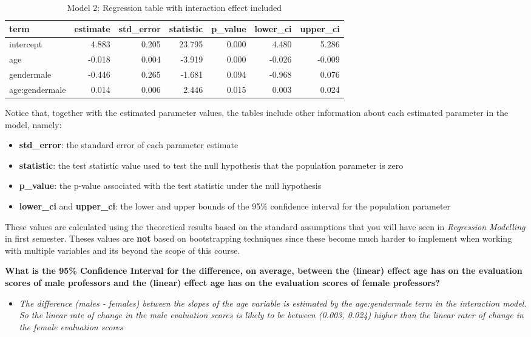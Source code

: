 \documentclass[]{article}
\providecommand{\tightlist}{%
  \setlength{\itemsep}{0pt}\setlength{\parskip}{0pt}}
\begin{document}
\begin{table}[!h]

\caption{\label{tab:table3}Model 2: Regression table with interaction effect included}
\centering
\begin{tabular}[t]{lrrrrrr}
\toprule
term & estimate & std\_error & statistic & p\_value & lower\_ci & upper\_ci\\
\midrule
intercept & 4.883 & 0.205 & 23.795 & 0.000 & 4.480 & 5.286\\
age & -0.018 & 0.004 & -3.919 & 0.000 & -0.026 & -0.009\\
gendermale & -0.446 & 0.265 & -1.681 & 0.094 & -0.968 & 0.076\\
age:gendermale & 0.014 & 0.006 & 2.446 & 0.015 & 0.003 & 0.024\\
\bottomrule
\end{tabular}
\end{table}

Notice that, together with the estimated parameter values, the tables
include other information about each estimated parameter in the model,
namely:

\begin{itemize}
\tightlist
\item
  \textbf{std\_error}: the standard error of each parameter estimate
\item
  \textbf{statistic}: the test statistic value used to test the null
  hypothesis that the population parameter is zero
\item
  \textbf{p\_value}: the p-value associated with the test statistic
  under the null hypothesis
\item
  \textbf{lower\_ci} and \textbf{upper\_ci}: the lower and upper bounds
  of the 95\% confidence interval for the population parameter
\end{itemize}

These values are calculated using the theoretical results based on the
standard assumptions that you will have seen in \emph{Regression
Modelling} in first semester. Theses values are \textbf{not} based on
bootstrapping techniques since these become much harder to implement
when working with multiple variables and its beyond the scope of this
course.

\textbf{What is the 95\% Confidence Interval for the difference, on
average, between the (linear) effect age has on the evaluation scores of
male professors and the (linear) effect age has on the evaluation scores
of female professors?}

\begin{itemize}
\tightlist
\item
  \emph{The difference (males - females) between the slopes of the age
  variable is estimated by the age:gendermale term in the interaction
  model. So the linear rate of change in the male evaluation scores is
  likely to be between (0.003, 0.024) higher than the linear rater of
  change in the female evaluation scores}
\end{itemize}
\end{document}
